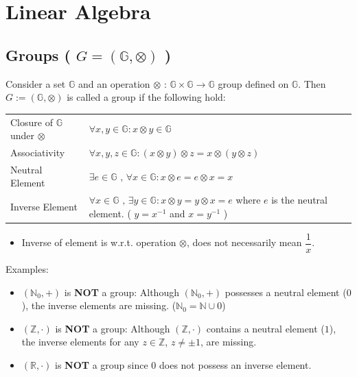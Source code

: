 \chapter{Linear Algebra \cite{mfml-1}}

\section{Groups ( $G = (\mathbb{G}, \otimes)$ ) \cite{mfml-1}}\label{lin-alg-Groups}

Consider a set $\mathbb{G}$ and an operation $\otimes$ : $\mathbb{G} \times \mathbb{G} \to \mathbb{G}$ group defined on $\mathbb{G}$. Then $G := (\mathbb{G}, \otimes)$ is called a group if the following hold:

\begin{table}[H]
    \begin{tabular}{l p{10cm}}
        Closure of $\mathbb{G}$ under $\otimes$ & $\forall x,y \in \mathbb{G} : x \otimes y \in \mathbb{G}$ \\
        Associativity & $\forall x,y,z \in \mathbb{G}:(x \otimes y) \otimes z = x \otimes (y \otimes z) $ \\
        Neutral Element & $\exists e \in \mathbb{G} \text{ , } \forall x\in \mathbb{G}: x \otimes e = e \otimes x = x$ \\
        Inverse Element & $\forall x\in \mathbb{G} \text{ , } \exists y \in \mathbb{G}: x\otimes y = y\otimes x = e$ where $e$ is the neutral element. ( $y = x^{-1}$ and $x = y^{-1}$ ) \\
    \end{tabular}
\end{table}

\begin{itemize}
    \item Inverse of element is w.r.t. operation $\otimes$, does not necessarily mean $\displaystyle\dfrac{1}{x}$.
\end{itemize}

Examples:
\begin{itemize}
    \item $(\mathbb{N}_0, +)$ is \textbf{NOT} a group: Although $(\mathbb{N}_0, +)$ possesses a neutral element ($0$), the inverse elements are missing. ($\mathbb{N}_0 = \mathbb{N} \cup {0} $)

    \item $(\mathbb{Z}, \cdot)$ is \textbf{NOT} a group: Although $(\mathbb{Z}, \cdot)$ contains a neutral element ($1$), the inverse elements for any $z \in \mathbb{Z}$, $z \neq \pm 1$, are missing.

    \item $(\mathbb{R}, \cdot)$ is \textbf{NOT} a group since $0$ does not possess an inverse element.

    
\end{itemize}









